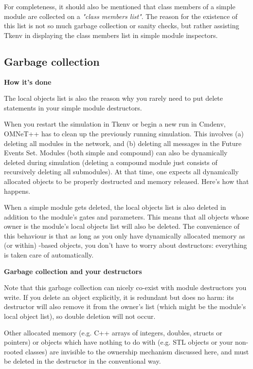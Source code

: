 For completeness, it should also be mentioned that class
members of a simple module are collected on a \textit{"class members list"}.
The reason for the existence of this list is not so much garbage collection
or sanity checks, but rather assisting Tkenv in displaying
the class members list in simple module inspectors.




\subsection{Garbage collection}

\textbf{How it's done}

The local objects list is also the reason why you rarely need to
put delete statements in your simple module destructors.

When you restart the simulation in Tkenv or begin a new run in Cmdenv,
OMNeT++ has to clean up the previously running simulation.
This involves (a) deleting all modules in the network, and
(b) deleting all messages in the Future Events Set.
Modules (both simple and compound) can also be dynamically deleted
during simulation (deleting a compound module just consists
of recursively deleting all submodules). At that time,
one expects all dynamically allocated objects to be properly
destructed and memory released. Here's how that happens.

When a simple module gets deleted, the local objects list is also deleted
in addition to the module's gates and parameters.
This means that all objects whose owner is the module's
local objects list will also be deleted.
The convenience of this behaviour is that as long as you only
have dynamically allocated memory as (or within) -based objects,
you don't have to worry about destructors: everything is taken
care of automatically.

\textbf{Garbage collection and your destructors}

Note that this garbage collection can nicely co-exist with module destructors
you write. If you delete an object explicitly, it is redundant
but does no harm: its destructor will also remove it from the
owner's list (which might be the module's local object list),
so double deletion will not occur.

Other allocated memory (e.g. C++ arrays of integers, doubles, structs
or pointers) or objects which have nothing to do with 
(e.g. STL objects or your non- rooted classes)
are invisible to the ownership mechanism discussed here,
and must be deleted in the destructor in the conventional way.

